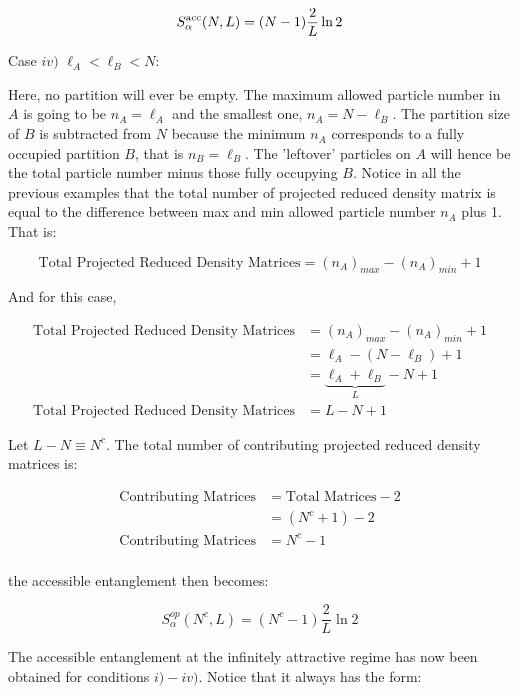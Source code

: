 \begin{equation}
S_{\alpha}^{\rm acc} (N, L) = (N - 1) \frac{2}{L} \ln{2}
\end{equation}

Case $iv)$ $\ell_{A} < \ell_{B} < N$:

Here, no partition will ever be empty. The maximum allowed particle number in $A$ is going to be $n_{A} = \ell_{A}$ and the smallest one, $n_{A} = N - \ell_{B}$. The partition size of $B$ is subtracted from $N$ because the minimum $n_A$ corresponds to a fully occupied partition $B$, that is $n_B = \ell_B$. The 'leftover' particles on $A$ will hence be the total particle number minus those fully occupying $B$. Notice in all the previous examples that the total number of projected reduced density matrix is equal to the difference between max and min allowed particle number $n_A$ plus 1. That is:

\begin{equation}
\text{Total Projected Reduced Density Matrices} = (n_A)_{max} - (n_A)_{min} + 1
\end{equation}

And for this case,

 \begin{align}
\text{Total Projected Reduced Density Matrices} &= (n_A)_{max} - (n_A)_{min} + 1 \nonumber \\
&= \ell_A - (N-\ell_B) + 1 \nonumber \\
&= \underbrace{\ell_A + \ell_B}_{L} - N + 1 \nonumber \\
\text{Total Projected Reduced Density Matrices} &= L - N + 1
\end{align}

Let $L-N \equiv N^c$. The total number of contributing projected reduced density matrices is:

\begin{align}
\text{Contributing Matrices} &= \text{Total Matrices} - 2 \nonumber \\
&= (N^c + 1) - 2 \nonumber \\
\text{Contributing Matrices} &= N^c - 1 \\
\end{align}

the accessible entanglement then becomes:

\begin{equation}
S_\alpha^{op}(N^c,L) = (N^c - 1) \frac{2}{L} \ln{2}
\end{equation}

The accessible entanglement at the infinitely attractive regime has now been obtained for conditions $i)-iv)$. Notice that it always has the form:

